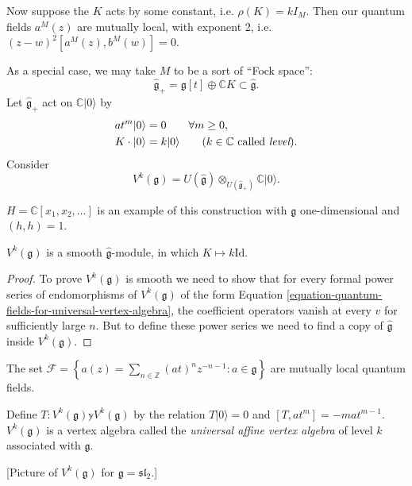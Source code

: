 \noindent
Now suppose the $K$ acts by some constant, i.e.
$\rho(K)=k I_M$.
Then our quantum fields $a^M(z)$ are
mutually local, with exponent 2, i.e.
$(z-w)^2[a^M(z),b^M(w)]=0$.

\medskip\noindent
As a special case, we may take
$M$ to be a sort of ``Fock space'':
$$
\hat{\mathfrak{g}}_+=\mathfrak{g}[t]\oplus \mathbb{C}K\subset
\hat{\mathfrak{g}}.
$$
Let $\hat{\mathfrak{g}}_+$ 
act on $\mathbb{C} |0\rangle$ by
\begin{align*}
at^m |0\rangle&=0 \qquad \forall m \geq 0,\\
K\cdot |0\rangle&=k |0\rangle\qquad  (\text{$k \in \mathbb{C}$ called {\it level}}).
\end{align*}
Consider
$$
V^k(\mathfrak{g})=U(\hat{\mathfrak{g}}) \otimes_{U(\hat{\mathfrak{g}}_+)}
\mathbb{C}|0\rangle.
$$

\begin{remark}
\label{remark-Heisenberg-is-a-special-case-of-smooth-construction}
$H=\mathbb{C}[x_1,x_2,\ldots]$ is an example of this construction with
$\mathfrak{g}$ one-dimensional and $(h,h)=1$.
\end{remark}

\begin{exercise}
\label{exercise-Vk-is-smooth}
$V^k(\mathfrak{g})$ is a smooth  $\hat{\mathfrak{g}}$-module,
in which $K \mapsto  k \text{Id}$.
\end{exercise}

\begin{proof}
To prove  $V^k(\mathfrak{g})$ is smooth
we need to show that for every
formal power series of endomorphisms of
$V^k(\mathfrak{g})$ of the form Equation
\ref{equation-quantum-fields-for-universal-vertex-algebra},
the coefficient operators vanish at every $v$ for sufficiently
large $n$. But to define these
power series we need to find a copy
of  $\hat{\mathfrak{g}}$ inside $V^k(\mathfrak{g})$.
\end{proof}

The set $\mathcal{F}=\left\{a(z)=\sum_{n \in \mathbb{Z}}
(at)^nz^{-n-1}:a \in \mathfrak{g}\right\}$ 
are mutually local quantum fields.

Define $T:V^k(\mathfrak{g})\mathbb{y} V^k(\mathfrak{g})$ 
by the relation $T |0\rangle=0$ 
and $[T,at^m]=-mat^{m-1}$.
$V^k(\mathfrak{g})$ is a vertex algebra
called the {\it universal affine vertex algebra} 
of level $k$ associated with $\mathfrak{g}$.

[Picture of $V^k(\mathfrak{g})$ for $\mathfrak{g}=\mathfrak{sl}_2$.]

